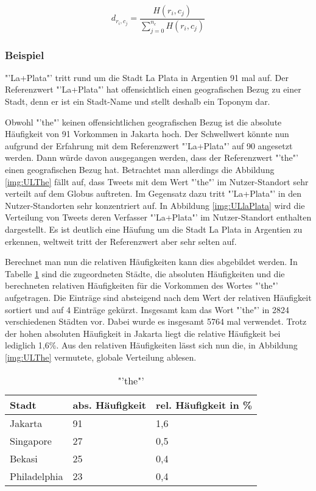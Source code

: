 				\begin{equation}
					d_{r_i,c_j}=\frac{H(r_i,c_j)}{\sum^{n_c}_{j=0}{H(r_i,c_j)}}
				\end{equation}	

			\subsubsection{Beispiel} 

				"'La+Plata"' tritt rund um die Stadt La Plata in Argentien 91 mal auf.
				Der Referenzwert "'La+Plata"' hat offensichtlich einen geografischen Bezug zu einer Stadt, denn er ist ein Stadt-Name und stellt deshalb ein Toponym dar. 

				Obwohl "'the"' keinen offensichtlichen geografischen Bezug ist die absolute Häufigkeit von 91 Vorkommen in Jakarta hoch.
				Der Schwellwert könnte nun aufgrund der Erfahrung mit dem Referenzwert "'La+Plata"' auf 90 angesetzt werden.
				Dann würde davon ausgegangen werden, dass der Referenzwert "'the"' einen geografischen Bezug hat.
				Betrachtet man allerdings die Abbildung \ref{img:ULThe} fällt auf, dass Tweets mit dem Wert "'the"' im Nutzer-Standort sehr verteilt auf dem Globus auftreten.
				Im Gegensatz dazu tritt "'La+Plata"' in den Nutzer-Standorten sehr konzentriert auf.
				In Abbildung \ref{img:ULlaPlata} wird die Verteilung von Tweets deren Verfasser "'La+Plata"' im Nutzer-Standort enthalten dargestellt. 
				Es ist deutlich eine Häufung um die Stadt La Plata in Argentien zu erkennen, weltweit tritt der Referenzwert aber sehr selten auf.
				
				Berechnet man nun die relativen Häufigkeiten kann dies abgebildet werden.
				In Tabelle \ref{tab:the} sind die zugeordneten Städte, die absoluten Häufigkeiten und die berechneten relativen Häufigkeiten für die Vorkommen des Wortes "'the"' aufgetragen. 
				Die Einträge sind absteigend nach dem Wert der relativen Häufigkeit sortiert und auf 4 Einträge gekürzt.
				Insgesamt kam das Wort "'the"' in 2824 verschiedenen Städten vor.
				Dabei wurde es insgesamt 5764 mal verwendet. 
				Trotz der hohen absoluten Häufigkeit in Jakarta liegt die relative Häufigkeit bei lediglich 1,6\%.
				Aus den relativen Häufigkeiten lässt sich nun die, in Abbildung \ref{img:ULThe} vermutete, globale Verteilung ablesen.


				\begin{table}[h]
				\centering
				\caption{"'the"'}
				\label{tab:the}
				\begin{tabular}{|l|l|l|}
				\hline
				Stadt             & abs. Häufigkeit & rel. Häufigkeit in \% \\ \hline \hline
				Jakarta           & 91              & 1,6                       \\ \hline
				Singapore         & 27              & 0,5                       \\ \hline
				Bekasi            & 25              & 0,4                       \\ \hline
				Philadelphia      & 23              & 0,4                       \\ \hline
				\end{tabular}
				\end{table}

